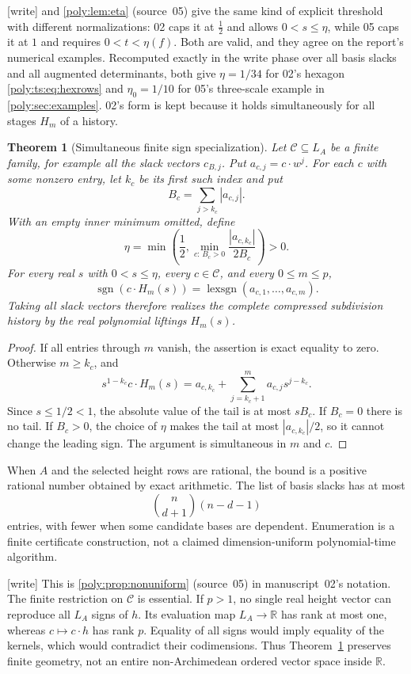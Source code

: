 \documentclass[11pt,a4paper]{article}
\numberwithin{equation}{section}
\newtheorem{theorem}{Theorem}[section]
\theoremstyle{plain}
\newcommand{\wtag}{\textup{[write]}}%
\newcommand{\R}{\mathbb R}
\newcommand{\sgn}{\operatorname{sgn}}
\newcommand{\lexsgn}{\operatorname{lexsgn}}
\newcommand{\cC}{\mathcal{C}}
\begin{document}
\noindent\wtag{}  and \cref{poly:lem:eta}
(source~05) give the same kind of explicit threshold with different
normalizations: 02 caps it at $\frac12$ and allows $0<s\le\eta$, while 05
caps it at $1$ and requires $0<t<\eta(f)$. Both are valid, and they agree
on the report's numerical examples. Recomputed exactly in the write phase
over all basis slacks and all augmented determinants, both give $\eta=1/34$
for 02's hexagon \eqref{poly:ts:eq:hexrows} and $\eta_0=1/10$ for 05's
three-scale example in \cref{poly:sec:examples}. 02's form is kept because
it holds simultaneously for all stages $H_m$ of a history.
\begin{theorem}[Simultaneous finite sign specialization]\label{poly:ts:thm:epsilon}
Let $\cC\subseteq L_A$ be a finite family, for example all the slack
vectors $c_{B,j}$. Put $a_{c,j}=c\cdot w^j$. For each $c$ with some nonzero
entry, let $k_c$ be its first such index and put
\[
 B_c=\sum_{j>k_c}|a_{c,j}|.
\]
With an empty inner minimum omitted, define
\begin{equation}\label{poly:ts:eq:eta}
 \eta=\min\left(\frac12,
       \min_{c:\,B_c>0}\frac{|a_{c,k_c}|}{2B_c}\right)>0.
\end{equation}
For every real $s$ with $0<s\le\eta$, every $c\in\cC$, and every
$0\le m\le p$,
\[
 \sgn(c\cdot H_m(s))
 =\lexsgn(a_{c,1},\ldots,a_{c,m}).
\]
Taking all slack vectors therefore realizes the complete compressed
subdivision history by the real polynomial liftings $H_m(s)$.
\end{theorem}
\begin{proof}
If all entries through $m$ vanish, the assertion is exact equality to zero.
Otherwise $m\ge k_c$, and
\[
 s^{1-k_c}c\cdot H_m(s)
 =a_{c,k_c}+\sum_{j=k_c+1}^m a_{c,j}s^{j-k_c}.
\]
Since $s\le1/2<1$, the absolute value of the tail is at most $sB_c$.
If $B_c=0$ there is no tail. If $B_c>0$, the choice of $\eta$ makes the
tail at most $|a_{c,k_c}|/2$, so it cannot change the leading sign.
The argument is simultaneous in $m$ and $c$.
\end{proof}

When $A$ and the selected height rows are rational, the bound is a positive
rational number obtained by exact arithmetic. The list of basis slacks has
at most
\[
 \binom{n}{d+1}(n-d-1)
\]
entries, with fewer when some candidate bases are dependent. Enumeration
is a finite certificate construction, not a claimed dimension-uniform
polynomial-time algorithm.

\begin{remark}
\wtag{} This is \cref{poly:prop:nonuniform} (source~05) in manuscript~02's
notation.
The finite restriction on $\cC$ is essential. If $p>1$, no single real
height vector can reproduce all $L_A$ signs of $h$. Its evaluation map
$L_A\to\R$ has rank at most one, whereas $c\mapsto c\cdot h$ has rank
$p$. Equality of all signs would imply equality of the kernels, which
would contradict their codimensions. Thus Theorem~\ref{poly:ts:thm:epsilon}
preserves finite geometry, not an entire non-Archimedean ordered vector
space inside $\R$.
\end{remark}
\end{document}
